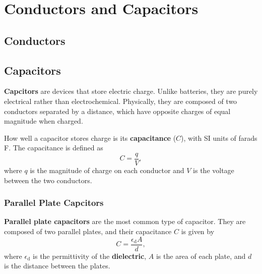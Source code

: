 \chapter{Conductors and Capacitors} \label{chap:conductors-and-capacitors}

\section{Conductors}

\section{Capacitors} \label{sec:capacitors}

\textbf{Capcitors} are devices that store electric charge.
Unlike batteries, they are purely electrical rather than electrochemical.
Physically,
they are composed of two conductors separated by a distance,
which have opposite charges of equal magnitude when charged.

How well a capacitor stores charge is its \textbf{capacitance} (\(C\)),
with SI units of farads \unit{\farad}.
The capacitance is defined as
\begin{equation}
  C = \frac{q}{V},
\end{equation}
where \(q\) is the magnitude of charge on each conductor
and \(V\) is the voltage between the two conductors.

\subsection{Parallel Plate Capcitors}

\textbf{Parallel plate capacitors} are the most common type of capacitor.
They are composed of two parallel plates,
and their capacitance \(C\) is given by
\begin{equation}
  C = \frac{\epsilon_\mathrm{d} A}{d},
\end{equation}
where \(\epsilon_\mathrm{d}\) is the permittivity of the \textbf{dielectric},
\(A\) is the area of each plate,
and \(d\) is the distance between the plates.
